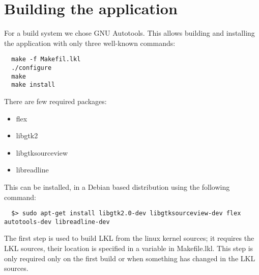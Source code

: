 \chapter{Building the application}


For a build system we chose GNU Autotools. This allows building
and installing the application with only three well-known commands:

\lstset{language=bash,caption=Build System,label=lst:building}
\begin{lstlisting}
  make -f Makefil.lkl
  ./configure
  make
  make install
\end{lstlisting}

There are few required packages:
\begin{itemize}
  \item flex
  \item libgtk2
  \item libgtksourceview
  \item libreadline
\end{itemize}

This can be installed, in a Debian based distribution using the following 
command:
\lstset{language=zsh,caption=Required packages,label=lst:bpacakges}
\begin{lstlisting}
  $> sudo apt-get install libgtk2.0-dev libgtksourceview-dev flex autotools-dev libreadline-dev
\end{lstlisting}

The first step is used to build LKL from the linux kernel sources; it
requires the LKL sources, their location is specified in a variable in
Makefile.lkl. This step is only required only on the first build or
when something has changed in the LKL sources.
